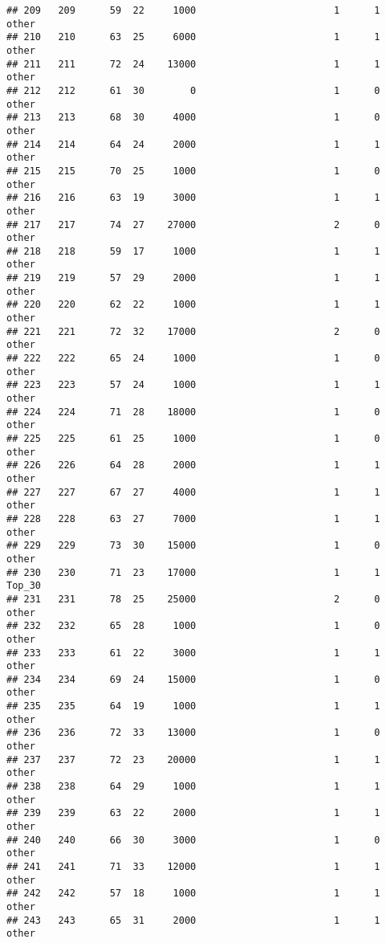 \documentclass[
]{article}
\begin{document}
\begin{verbatim}
## 209   209      59  22     1000                        1      1    other
## 210   210      63  25     6000                        1      1    other
## 211   211      72  24    13000                        1      1    other
## 212   212      61  30        0                        1      0    other
## 213   213      68  30     4000                        1      0    other
## 214   214      64  24     2000                        1      1    other
## 215   215      70  25     1000                        1      0    other
## 216   216      63  19     3000                        1      1    other
## 217   217      74  27    27000                        2      0    other
## 218   218      59  17     1000                        1      1    other
## 219   219      57  29     2000                        1      1    other
## 220   220      62  22     1000                        1      1    other
## 221   221      72  32    17000                        2      0    other
## 222   222      65  24     1000                        1      0    other
## 223   223      57  24     1000                        1      1    other
## 224   224      71  28    18000                        1      0    other
## 225   225      61  25     1000                        1      0    other
## 226   226      64  28     2000                        1      1    other
## 227   227      67  27     4000                        1      1    other
## 228   228      63  27     7000                        1      1    other
## 229   229      73  30    15000                        1      0    other
## 230   230      71  23    17000                        1      1   Top_30
## 231   231      78  25    25000                        2      0    other
## 232   232      65  28     1000                        1      0    other
## 233   233      61  22     3000                        1      1    other
## 234   234      69  24    15000                        1      0    other
## 235   235      64  19     1000                        1      1    other
## 236   236      72  33    13000                        1      0    other
## 237   237      72  23    20000                        1      1    other
## 238   238      64  29     1000                        1      1    other
## 239   239      63  22     2000                        1      1    other
## 240   240      66  30     3000                        1      0    other
## 241   241      71  33    12000                        1      1    other
## 242   242      57  18     1000                        1      1    other
## 243   243      65  31     2000                        1      1    other

\end{verbatim}
\end{document}
